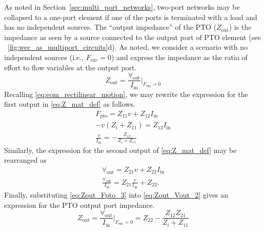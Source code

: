 \documentclass[lettersize,journal]{IEEEtran}
\begin{document}
As noted in Section~\ref{sec:multi_port_networks}, two-port networks may be collapsed to a one-port element if one of the ports is terminated with a load and has no independent sources.
The ``output impedance'' of the PTO ($Z_{\textrm{out}}$) is the impedance as seen by a source connected to the output port of PTO element (see \figurename~\ref{fig:wec_as_multiport_circuits}d).
As noted, we consider a scenario with no independent sources (i.e., $F_{\textrm{exc}} = 0$) and express the impedance as the ratio of effort to flow variables at the output port. 
%
\begin{equation}
        Z_{\textrm{out}} = \frac{\forall_{\textrm{out}}}{I_{\textrm{in}}} \bigg\vert_{F_{\textrm{exc}}=0}
        \label{eq:Zout_1}
\end{equation}
%
Recalling \eqref{eq:eom_rectilinear_motion}, we may rewrite the expression for the first output in \eqref{eq:Z_mat_def} as follows.
%
\begin{subequations}
        \begin{align}
                F_{\textrm{pto}} = Z_{11} v + Z_{12} I_{\textrm{in}} \label{eq:Zout_Fpto_1} \\[0.5em]
                -v (Z_i + Z_{11}) = Z_{12} I_{\textrm{in}} \label{eq:Zout_Fpto_2} \\[0.5em]
                \frac{v}{I_{\textrm{in}}} = -\frac{Z_{12}}{Z_i + Z_{11}} \label{eq:Zout_Fpto_3}
        \end{align}
        \label{eq:Zout_Fpto}%
\end{subequations}
%
Similarly, the expression for the second output of \eqref{eq:Z_mat_def} may be rearranged as
%
\begin{subequations}
        \begin{align}
                \forall_{\textrm{out}} = Z_{21} v + Z_{22} I_{\textrm{in}} \label{eq:Zout_Vout_1} \\[0.5em]
                \frac{\forall_{\textrm{out}}}{I_{\textrm{in}}} = Z_{21} \frac{v}{I_{\textrm{in}}} + Z_{22} . \label{eq:Zout_Vout_2}
        \end{align} 
        \label{eq:Zout_Vout}%
\end{subequations}
%
Finally, substituting \eqref{eq:Zout_Fpto_3} into \eqref{eq:Zout_Vout_2} gives an expression for the PTO output port impedance.
%
\begin{equation}
        Z_{\textrm{out}} = \frac{\forall_{\textrm{out}}}{I_{\textrm{in}}} \bigg\vert_{F_{\textrm{exc}}=0} = Z_{22} - \frac{Z_{12} Z_{21}}{Z_{i} + Z_{11}}
        \label{eq:pto_output_port_impedance}
\end{equation}
\end{document}
